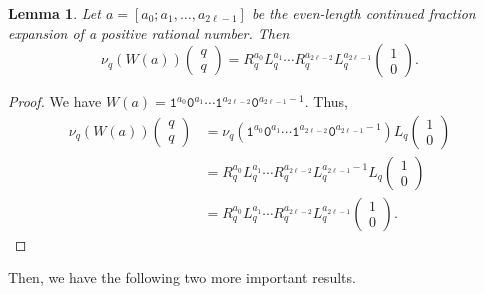 \documentclass[a4paper,12pt]{amsart}
\newtheorem{lemma}[definition]{Lemma}
\newcommand{\0}{\mathtt{0}}
\newcommand{\1}{\mathtt{1}}
\newcommand{\2}{\mathtt{2}}
\newcommand{\3}{\mathtt{3}}
\begin{document}
    \begin{lemma}\label{lem:sufficient-conditions-qcontinued-fraction}
        Let $a=[a_0;a_1,\dots,a_{2\ell-1}]$ be the even-length continued fraction expansion
        of a positive rational number.
        Then
        \begin{equation*}
                \nu_q(W(a))
            \left(\begin{smallmatrix} q \\ q \end{smallmatrix}\right)
            =
            R_q^{a_0}L_q^{a_1}\cdots R_q^{a_{2\ell-2}}L_q^{a_{2\ell-1}}
            \left(\begin{smallmatrix} 1 \\ 0 \end{smallmatrix}\right).
        \end{equation*}
    \end{lemma}

\begin{proof}
    We have $W(a)=\1^{a_0}\0^{a_{1}}\cdots \1^{a_{2\ell-2}}\0^{a_{2\ell-1}-1}$.
    Thus,
    \begin{align*}
        \nu_q(W(a))
        \left(\begin{smallmatrix} q \\ q \end{smallmatrix}\right)
        &=
        \nu_q(\1^{a_0}\0^{a_{1}}\cdots \1^{a_{2\ell-2}}\0^{a_{2\ell-1}-1})
           L_q
        \left(\begin{smallmatrix} 1 \\ 0 \end{smallmatrix}\right)\\
        &=
        R_q^{a_0}L_q^{a_1}\cdots R_q^{a_{2\ell-2}}L_q^{a_{2\ell-1}-1}L_q
        \left(\begin{smallmatrix} 1 \\ 0 \end{smallmatrix}\right)\\
        &=
        R_q^{a_0}L_q^{a_1}\cdots R_q^{a_{2\ell-2}}L_q^{a_{2\ell-1}}
        \left(\begin{smallmatrix} 1 \\ 0 \end{smallmatrix}\right).
    \end{align*}
\end{proof}

Then, we have the following two more important results.
\end{document}
